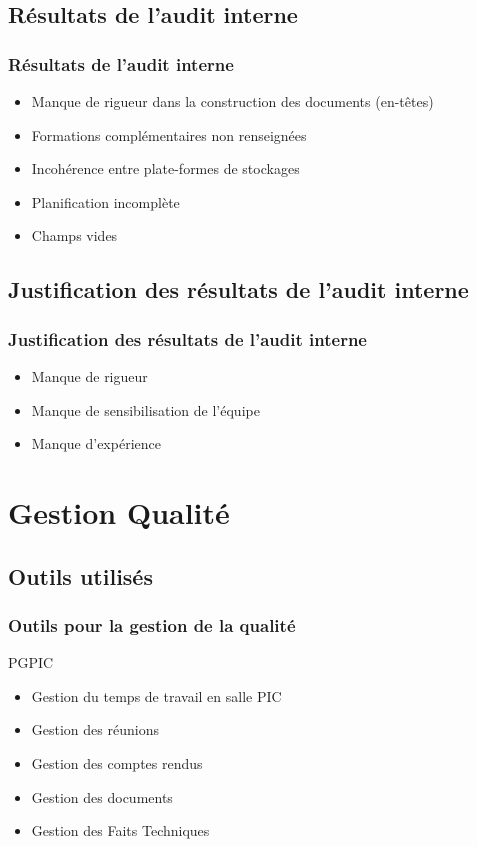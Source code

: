\documentclass[compress,xcolor=dvipsnames]{beamer}
\begin{document}
\subsection{Résultats de l'audit interne}
\begin{frame}
\frametitle{Résultats de l'audit interne}
\begin{itemize}
\item Manque de rigueur dans la construction des documents (en-têtes)
\item Formations complémentaires non renseignées
\item Incohérence entre plate-formes de stockages
\item Planification incomplète
\item Champs vides
\end{itemize}
\end{frame}

\subsection{Justification des résultats de l'audit interne}
\begin{frame}
\frametitle{Justification des résultats de l'audit interne}
\begin{itemize}
\item Manque de rigueur
\item Manque de sensibilisation de l'équipe
\item Manque d’expérience
\end{itemize}
\end{frame} 

\section{Gestion Qualité}
\subsection{Outils utilisés}
\begin{frame}
\frametitle{Outils pour la gestion de la qualité}
\begin{block}{PGPIC}
\begin{itemize}
\item Gestion du temps de travail en salle PIC
\item Gestion des réunions
\item Gestion des comptes rendus
\item Gestion des documents
\item Gestion des Faits Techniques
\end{itemize}
\end{block}
\end{frame}
\end{document}
